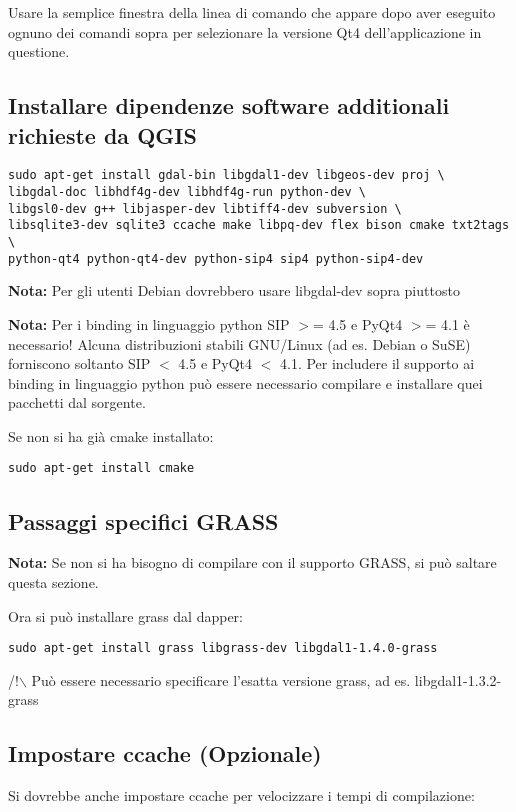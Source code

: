 Usare la semplice finestra della linea di comando che appare dopo aver eseguito ognuno dei comandi sopra per selezionare la versione Qt4 dell'applicazione in questione.

\subsection{Installare dipendenze software additionali richieste da QGIS}
\begin{verbatim}
sudo apt-get install gdal-bin libgdal1-dev libgeos-dev proj \
libgdal-doc libhdf4g-dev libhdf4g-run python-dev \
libgsl0-dev g++ libjasper-dev libtiff4-dev subversion \
libsqlite3-dev sqlite3 ccache make libpq-dev flex bison cmake txt2tags \
python-qt4 python-qt4-dev python-sip4 sip4 python-sip4-dev
\end{verbatim}

\textbf{Nota:} Per gli utenti Debian dovrebbero usare libgdal-dev sopra piuttosto

\textbf{Nota:} Per i binding in linguaggio python SIP $>$= 4.5 e PyQt4 $>$= 4.1 è necessario! Alcuna distribuzioni stabili GNU/Linux (ad es. Debian o SuSE) forniscono soltanto SIP $<$ 4.5 e PyQt4 $<$ 4.1. Per includere il supporto ai binding in linguaggio python può essere necessario compilare e installare quei pacchetti dal sorgente.

Se non si ha già cmake installato:

\begin{verbatim}
sudo apt-get install cmake
\end{verbatim}

\subsection{Passaggi specifici GRASS}
\textbf{Nota:} Se non si ha bisogno di compilare con il supporto GRASS, si può saltare questa sezione.

Ora si può installare grass dal dapper:

\begin{verbatim}
sudo apt-get install grass libgrass-dev libgdal1-1.4.0-grass 
\end{verbatim}

/!$\backslash$ Può essere necessario specificare l'esatta versione grass, ad es. libgdal1-1.3.2-grass

\subsection{Impostare ccache (Opzionale)}
Si dovrebbe anche impostare ccache per velocizzare i tempi di compilazione:

